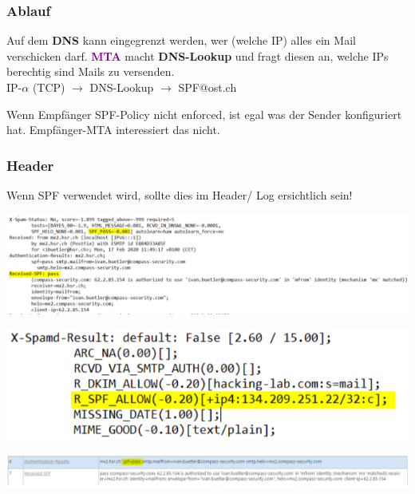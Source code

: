 \subsubsection{Ablauf}
Auf dem \textbf{DNS} kann eingegrenzt werden, wer (welche IP) alles ein Mail verschicken darf.
\textcolor{purple}{\textbf{MTA}} macht \textbf{DNS-Lookup} und fragt diesen an, welche IPs berechtig sind Mails zu versenden.\\
IP-$\alpha$ (TCP) $\rightarrow$ DNS-Lookup $\rightarrow$ SPF@ost.ch

Wenn Empfänger SPF-Policy nicht enforced, ist egal was der Sender konfiguriert hat. Empfänger-MTA interessiert das nicht.\\

\subsubsection{Header}
Wenn SPF verwendet wird, sollte dies im Header/ Log ersichtlich sein!
\begin{center}
    \vspace{-8pt}
    \includegraphics[width=1.0\linewidth]{./img/07-mail_security/spf}
    \vspace{-8pt}
\end{center}
\begin{center}
    \vspace{-8pt}
    \includegraphics[width=.6\linewidth]{./img/07-mail_security/spf2}
    \vspace{-8pt}
\end{center}
\begin{center}
    \vspace{-8pt}
    \includegraphics[width=1.0\linewidth]{./img/07-mail_security/spf3}
    \vspace{-8pt}
\end{center}

